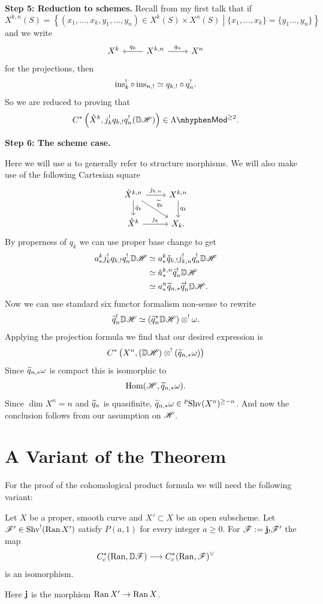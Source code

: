 \documentclass[oneside]{amsart}
\newcommand{\pShv}{\prescript{p}{}{\Shv}}
\begin{document}
\textbf{Step 5: Reduction to schemes.}
Recall from my first talk that if
\[
X^{k,n}(S) = \left\{ (x_1,\dots,x_k,y_1,\dots,y_n)\in X^{k}(S)\times X^{n}(S) \middle| \{x_1,\dots,x_k\} = \{y_1\dots,y_n\}  \right\} 
\] 
and we write
\[
\begin{tikzcd}
	X^{k} & X^{k,n} \ar[l,"q_k"'] \ar[r,"q_n"] & X^{n}
\end{tikzcd}
\] 
for the projections, then
\[
\operatorname{ins}_k^{!}\circ \operatorname{ins}_{n,!} \simeq q_{k,!}\circ q_n^{!}.
\] 
So we are reduced to proving that
\[
	C^{*}\left( \mathring{X}^{k},j_k^{!}q_{k,!}q_n^{!}(\VD\CH) \right) \in \lMod^{\ge 2}.
\] 

\textbf{Step 6: The scheme case.}

Here we will use $a$ to generally refer to structure morphisms. We will also make use of the following Cartesian square
\[
\begin{tikzcd}
	\mathring{X}^{k,n} \ar[r,"j_{k,n}"] \ar[d,"\mathring{q}_k"] \ar[dr,"\wt{q}_k"] & X^{k,n} \ar[d,"q_k"] \\
	\mathring{X}^{k} \ar[r,"j_k"] & X_k.
\end{tikzcd}
\] 
By properness of $q_k$ we can use proper base change to get
\begin{align*}
	a^{k}_*j_k^{!}q_{k,!}q_n^{!}\mathbb{D}\mathscr{H} &\simeq a^{k}_*\mathring{q}_{k,!}j_{k,n}^{!}q_n^{!}\mathbb{D}\mathscr{H} \\
					   &\simeq \mathring{a}^{k,n}_* \widetilde{q}_n^{!}\mathbb{D}\mathscr{H} \\
					   &\simeq a^{n}_* \widetilde{q}_{n,*}\widetilde{q}_n^{!}\mathbb{D}\mathscr{H}.
\end{align*} 
Now we can use standard six functor formalism non-sense to rewrite
\[
	\widetilde{q}_n^{!}\mathbb{D}\mathscr{H} \simeq (\widetilde{q}_n^{*}\mathbb{D}\mathscr{H}) \otimes^{!} \omega.
\] 
Applying the projection formula we find that our desired expression is
\[
	C^{*}\left( X^{n},(\mathbb{D}\mathscr{H})\otimes^{!}(\widetilde{q}_{n,*}\omega) \right) 
\] 
Since $\widetilde{q}_{n,*}\omega$ is compact this is isomorphic to
\[
	\operatorname{Hom}(\mathscr{H},\widetilde{q}_{n,*}\omega).
\] 
Since $\dim X^{n}=n$ and $\widetilde{q}_n$ is quasifinite, $\wt{q}_{n,*}\omega\in \pShv(X^{n})^{\ge -n}$. And now the conclusion follows from our assumption on $\mathscr{H}$.

\section{A Variant of the Theorem}
For the proof of the cohomological product formula we will need the following variant:
\begin{theorem}
	Let $X$ be a proper, smooth curve and $X'\subset X$ be an open subscheme. Let $\mathscr{F}'\in \operatorname{Shv}^{!}(\operatorname{Ran} X')$ satisfy $P(a,1)$ for every integer $a\ge 0$. For $\mathscr{F} := \mathbf{j}_{!}\mathscr{F}'$ the map
	\[
	C^{*}_c(\Ran, \VD\CF) \to C^{*}_c(\Ran,\CF)^{\vee}
	\] 
	is an isomorphism.
\end{theorem}
Here $\mathbf{j}$ is the morphism $\Ran X'\to \Ran X$.
\end{document}

